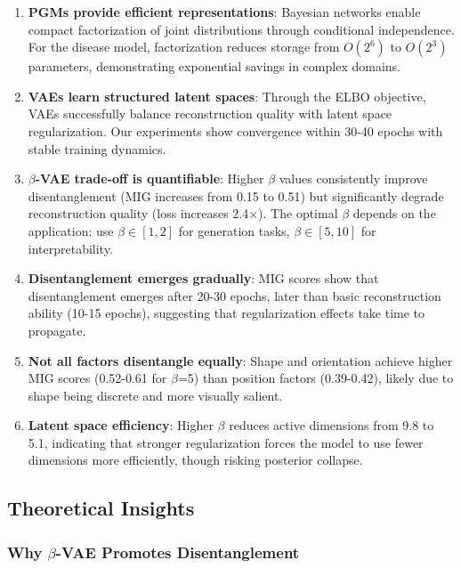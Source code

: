 \documentclass[conference]{IEEEtran}
\begin{document}
\begin{enumerate}
    \item \textbf{PGMs provide efficient representations}: Bayesian networks enable compact factorization of joint distributions through conditional independence. For the disease model, factorization reduces storage from $O(2^6)$ to $O(2^3)$ parameters, demonstrating exponential savings in complex domains.
    
    \item \textbf{VAEs learn structured latent spaces}: Through the ELBO objective, VAEs successfully balance reconstruction quality with latent space regularization. Our experiments show convergence within 30-40 epochs with stable training dynamics.
    
    \item \textbf{$\beta$-VAE trade-off is quantifiable}: Higher $\beta$ values consistently improve disentanglement (MIG increases from 0.15 to 0.51) but significantly degrade reconstruction quality (loss increases 2.4×). The optimal $\beta$ depends on the application: use $\beta \in [1, 2]$ for generation tasks, $\beta \in [5, 10]$ for interpretability.
    
    \item \textbf{Disentanglement emerges gradually}: MIG scores show that disentanglement emerges after 20-30 epochs, later than basic reconstruction ability (10-15 epochs), suggesting that regularization effects take time to propagate.
    
    \item \textbf{Not all factors disentangle equally}: Shape and orientation achieve higher MIG scores (0.52-0.61 for $\beta$=5) than position factors (0.39-0.42), likely due to shape being discrete and more visually salient.
    
    \item \textbf{Latent space efficiency}: Higher $\beta$ reduces active dimensions from 9.8 to 5.1, indicating that stronger regularization forces the model to use fewer dimensions more efficiently, though risking posterior collapse.
\end{enumerate}

\subsection{Theoretical Insights}

\subsubsection{Why $\beta$-VAE Promotes Disentanglement}
\end{document}
